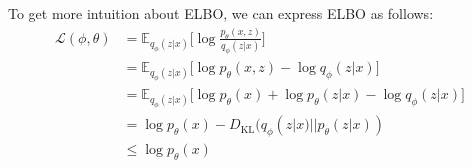 


To get more intuition about ELBO, we can express ELBO as follows:
\begin{align*}
	\mathcal{L}(\phi,\theta) & = \mathbb{E}_{q_{\phi}(z|x)}\Bigg[\log \frac{p_{\theta}(x,z)}{q_{\phi}(z|x) }\Bigg]\\
	& = \mathbb{E}_{q_{\phi}(z|x)}\Bigg[\log p_{\theta}(x,z)-\log q_{\phi}(z|x)\Bigg]\\
	& = \mathbb{E}_{q_{\phi}(z|x)}\Bigg[\log p_{\theta}(x)+\log p_{\theta}(z|x)-\log q_{\phi}(z|x)\Bigg]\\
	& = \log p_{\theta}(x) - D_{\textrm{KL}}(q_{\phi}(z|x)||p_{\theta}(z|x))\\
	& \leq \log p_{\theta}(x)
\end{align*}


